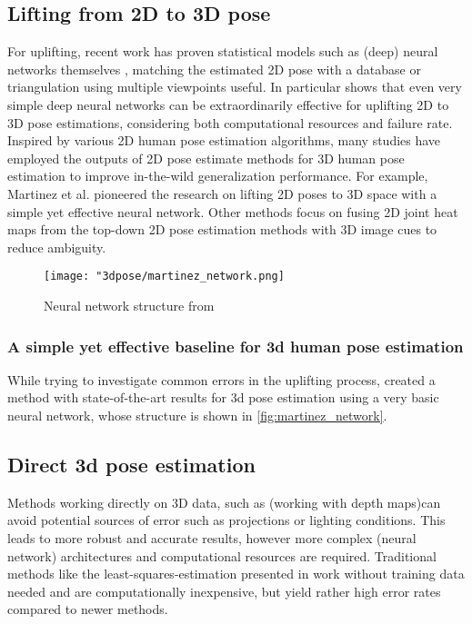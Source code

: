\subsection{Lifting from 2D to 3D pose}
For uplifting, recent work has proven statistical models such as (deep) neural networks themselves \cite{Tome_2017_CVPR, Martinez_2017_ICCV}, matching the estimated 2D pose with a database \cite{Chen_2017_CVPR} or triangulation using multiple viewpoints \cite{Dong_2019_CVPR} useful. In particular \cite{Martinez_2017_ICCV} shows that even very simple deep neural networks can be extraordinarily effective for uplifting 2D to 3D pose estimations, considering both computational resources and failure rate.
\newline
Inspired by various 2D human pose estimation algorithms, many studies have employed the outputs of 2D pose estimate methods for 3D human pose estimation to improve in-the-wild generalization performance. For example, Martinez et al. \cite{Martinez_2017_ICCV} pioneered the research on lifting 2D poses to 3D space with a simple yet effective neural network. Other methods \cite{park_3d_2016, wang_deep_2021, zhou_hemlets_2019, habibie_wild_2019, tekin_learning_2017} focus on fusing 2D joint heat maps from the top-down 2D pose estimation methods with 3D image cues to reduce ambiguity. 

\begin{figure*}[!htb]
	\centering
	\texttt{[image: "3dpose/martinez\_network.png]}
	\caption{Neural network structure from \cite{Martinez_2017_ICCV}}
	\label{fig:martinez_network}
\end{figure*}

\subsubsection{A simple yet effective baseline for 3d human pose estimation}
While trying to investigate common errors in the uplifting process, \cite{Martinez_2017_ICCV} created a method with state-of-the-art results for 3d pose estimation using a very basic neural network, whose structure is shown in \autoref{fig:martinez_network}.

\subsection{Direct 3d pose estimation}
Methods working directly on 3D data, such as \cite{Ye2011} (working with depth maps)can avoid potential sources of error such as projections or lighting conditions. This leads to more robust and accurate results, however more complex (neural network) architectures and computational resources are required. Traditional methods like the least-squares-estimation presented in \cite{Haralick98} work without training data needed and are computationally inexpensive, but yield rather high error rates compared to newer methods.

